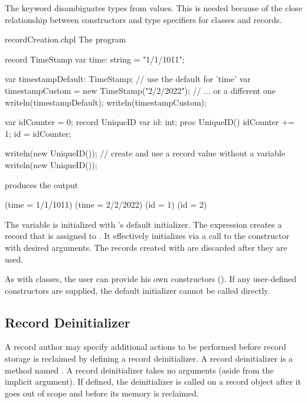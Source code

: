 \begin{rationale}
The  keyword disambiguates types from values. This is needed because of the close
relationship between constructors and type specifiers for classes and
records.
\end{rationale}

\begin{chapelexample}{recordCreation.chpl}
The program
\begin{chapel}
record TimeStamp {
  var time: string = "1/1/1011";
}

var timestampDefault: TimeStamp;                  // use the default for 'time'
var timestampCustom = new TimeStamp("2/2/2022");  // ... or a different one
writeln(timestampDefault);
writeln(timestampCustom);

var idCounter = 0;
record UniqueID {
  var id: int;
  proc UniqueID() { idCounter += 1; id = idCounter; }
}

writeln(new UniqueID());  // create and use a record value without a variable
writeln(new UniqueID());
\end{chapel}
produces the output
\begin{chapelprintoutput}{}
(time = 1/1/1011)
(time = 2/2/2022)
(id = 1)
(id = 2)
\end{chapelprintoutput}
The variable  is initialized with 's
default initializer. The expression  creates a record that
is assigned to .  It effectively
initializes  via a call to the constructor with desired
arguments. The records created with  are discarded after
they are used.
\end{chapelexample}

As with classes, the user can provide his own constructors
().  If any user-defined constructors are
supplied, the default initializer cannot be called directly.  

\subsection{Record Deinitializer}
\label{Record_Deinitializer}

A record author may specify additional actions to be performed before record storage is
reclaimed by defining a record deinitializer.  A record deinitializer is a method named
.  A record deinitializer takes no arguments
(aside from the implicit  argument).  If defined, the deinitializer is called
on a record object after it goes out of scope and before its memory is reclaimed.

